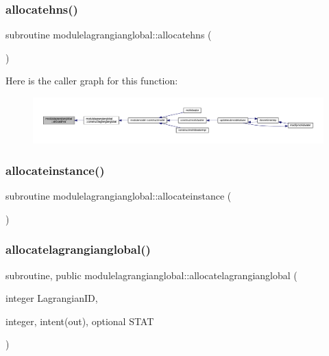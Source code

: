\subsubsection{\texorpdfstring{allocatehns()}{allocatehns()}}
{\footnotesize\ttfamily subroutine modulelagrangianglobal\+::allocatehns (\begin{DoxyParamCaption}{ }\end{DoxyParamCaption})\hspace{0.3cm}{\ttfamily [private]}}

Here is the caller graph for this function\+:\nopagebreak
\begin{figure}[H]
\begin{center}
\leavevmode
\includegraphics[width=350pt]{namespacemodulelagrangianglobal_aa4f2e4611a6f55063b6b425e9af734c9_icgraph}
\end{center}
\end{figure}
\mbox{\label{namespacemodulelagrangianglobal_abce203684794c35638261e5dc08eae81}} 
\subsubsection{\texorpdfstring{allocateinstance()}{allocateinstance()}}
{\footnotesize\ttfamily subroutine modulelagrangianglobal\+::allocateinstance (\begin{DoxyParamCaption}{ }\end{DoxyParamCaption})\hspace{0.3cm}{\ttfamily [private]}}

\mbox{\label{namespacemodulelagrangianglobal_a8ae3b3566ebe3cc057810473a03a4abf}} 
\subsubsection{\texorpdfstring{allocatelagrangianglobal()}{allocatelagrangianglobal()}}
{\footnotesize\ttfamily subroutine, public modulelagrangianglobal\+::allocatelagrangianglobal (\begin{DoxyParamCaption}\item[{integer}]{Lagrangian\+ID,  }\item[{integer, intent(out), optional}]{S\+T\+AT }\end{DoxyParamCaption})}

